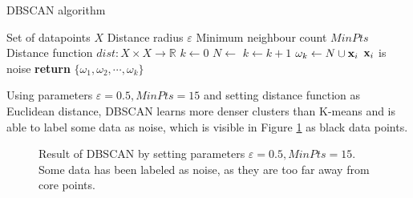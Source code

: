 \begin{algorithm}[ht]
\caption{DBSCAN algorithm \cite{Ester:1996:DAD:3001460.3001507, Schubert:2017:DRR:3129336.3068335}}
\label{alg-dbscan}
\begin{algorithmic}

\Require Set of datapoints $X$
\Require Distance radius $\varepsilon$
\Require Minimum neighbour count $MinPts$
\Require Distance function $dist: X \times X \rightarrow \mathbb{R}$
   \State $k \gets 0$
    \State $N \gets $ 
        \State $k \gets k + 1$
        \State $\omega_k \gets N \cup \mathbf{x}_i$
    \Else
        \State $\mathbf{x}_i$ is noise
    \EndIf
   \EndFor
   \State \textbf{return} $\{\omega_1, \omega_2, \cdots, \omega_k\}$
\EndProcedure

\end{algorithmic}
\end{algorithm}

\newpage

Using parameters $\varepsilon = 0.5, MinPts = 15$ and setting distance function as Euclidean distance, DBSCAN learns more denser clusters than K-means and is able to label some data as noise, which is visible in Figure \ref{fig-dbscan-example} as black data points.

\begin{figure}[!h]
\centering
\setlength\figureheight{8cm}
\setlength\figurewidth{8cm}

\caption{Result of DBSCAN by setting parameters $\varepsilon = 0.5, MinPts = 15$. Some data has been labeled as noise, as they are too far away from core points.} \label{fig-dbscan-example}
\end{figure}

